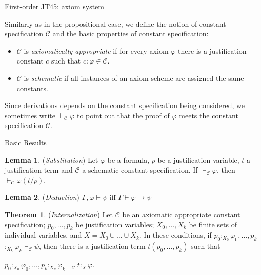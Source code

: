\documentclass{beamer}
\theoremstyle{definition}
\newtheorem{teor}{Theorem}
\newtheorem{lema}{Lemma}
\newcommand{\C}{\mathcal{C}}
\newcommand{\impli}{\rightarrow}
\newcommand{\teo}{\vdash}
\begin{document}
\begin{frame}{First-order JT45: axiom system}

\qquad Similarly as in the propositional case, we define the notion of constant specification $\C$ and the basic properties of constant specification:

\begin{itemize}
\item $\C$ is \textit{axiomatically appropriate} if for every axiom $\varphi$ there is a justification constant $c$ such that $c$$:$$\varphi\in \C$.
\item $\C$ is \textit{schematic} if all instances of an axiom scheme are assigned the same constants.	 
\end{itemize}	
\vspace{5 mm}

\qquad Since derivations depends on the constant specification being considered, we sometimes write $\teo_{\C} \varphi$ to point out that the proof of $\varphi$ meets the constant specification $\C$.

\end{frame}	



\begin{frame}{Basic Results}
\begin{lema}
	(\textit{Substitution}) Let $\varphi$ be a formula, $p$ be a justification variable, $t$ a justification term and $\C$ a schematic constant specification. If  $\teo_{\C} \varphi$, then  $\teo_{\C} \varphi(t/p)$.
\end{lema}

\begin{lema}
	(\textit{Deduction})  $\Gamma,\varphi \teo \psi$ iff  $\Gamma \teo \varphi \impli \psi$
\end{lema}

\begin{teor}
	(\textit{Internalization}) Let $\C$ be an axiomatic appropriate constant specification; $p_{0}, \dots, p_{k}$ be justification variables; $X_{0}, \dots, X_{k}$ be finite sets of individual variables, and $X =X_{0} \cup \dots \cup X_{k}$. In these conditions, if  $p_{0}$$:_{X_{0}}$$\varphi_{0}, \dots, p_{k}$$:_{X_{k}}$$\varphi_{k} \teo_{\C} \psi$, then there is a justification term $t(p_{0}, \dots, p_{k})$ such that 

	\begin{center}
	$p_{0}$$:_{X_{0}}$$\varphi_{0}, \dots, 
	p_{k}$$:_{X_{k}}$$\varphi_{k} \teo_{\C} t$$:_{X}$$\varphi$.
	\end{center}

\end{teor}
\end{frame}
\end{document}
